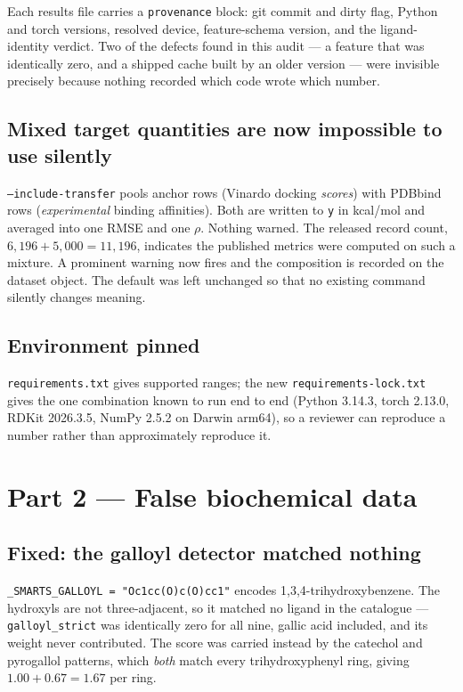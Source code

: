 \documentclass[11pt,a4paper]{article}
\newcommand{\bad}[1]{\textcolor{badred}{#1}}
\newcommand{\code}[1]{\texttt{\small #1}}
\begin{document}
Each results file carries a \code{provenance} block: git commit and dirty
flag, Python and torch versions, resolved device, feature-schema version, and
the ligand-identity verdict. Two of the defects found in this audit --- a
feature that was identically zero, and a shipped cache built by an older
version --- were invisible precisely because nothing recorded which code wrote
which number.

\subsection{Mixed target quantities are now impossible to use silently}

\code{--include-transfer} pools anchor rows (Vinardo docking \emph{scores})
with PDBbind rows (\emph{experimental} binding affinities). Both are written
to \code{y} in kcal/mol and averaged into one RMSE and one $\rho$. Nothing
warned. The released record count, $6{,}196 + 5{,}000 = 11{,}196$, indicates
the published metrics were computed on such a mixture. A prominent warning now
fires and the composition is recorded on the dataset object. The default was
left unchanged so that no existing command silently changes meaning.

\subsection{Environment pinned}

\code{requirements.txt} gives supported ranges; the new
\code{requirements-lock.txt} gives the one combination known to run end to end
(Python 3.14.3, torch 2.13.0, RDKit 2026.3.5, NumPy 2.5.2 on Darwin arm64), so
a reviewer can reproduce a number rather than approximately reproduce it.

\section{Part 2 --- False biochemical data}

\subsection{Fixed: the galloyl detector matched nothing}

\code{\_SMARTS\_GALLOYL = "Oc1cc(O)c(O)cc1"} encodes 1,3,4-trihydroxybenzene.
The hydroxyls are not three-adjacent, so it matched \bad{no ligand in the
catalogue} --- \code{galloyl\_strict} was identically zero for all nine,
gallic acid included, and its weight never contributed. The score was carried
instead by the catechol and pyrogallol patterns, which \emph{both} match every
trihydroxyphenyl ring, giving $1.00 + 0.67 = 1.67$ per ring.
\end{document}
